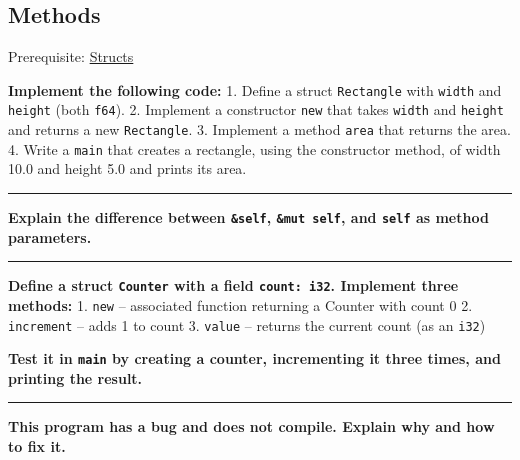 \documentclass[
  11pt,
]{article}
\newenvironment{Shaded}{}{}
\begin{document}
\subsection{Methods}\label{methods}

Prerequisite: \hyperref[structs]{Structs}

\textbf{Implement the following code:} 1. Define a struct
\texttt{Rectangle} with \texttt{width} and \texttt{height} (both
\texttt{f64}). 2. Implement a constructor \texttt{new} that takes
\texttt{width} and \texttt{height} and returns a new \texttt{Rectangle}.
3. Implement a method \texttt{area} that returns the area. 4. Write a
\texttt{main} that creates a rectangle, using the constructor method, of
width 10.0 and height 5.0 and prints its area.

\begin{Shaded}
\begin{Highlighting}[]

\end{Highlighting}
\end{Shaded}

\begin{center}\rule{0.5\linewidth}{0.5pt}\end{center}

\textbf{Explain the difference between \texttt{\&self},
\texttt{\&mut\ self}, and \texttt{self} as method parameters.}

\begin{center}\rule{0.5\linewidth}{0.5pt}\end{center}

\textbf{Define a struct \texttt{Counter} with a field
\texttt{count:\ i32}. Implement three methods:} 1. \texttt{new} --
associated function returning a Counter with count 0 2.
\texttt{increment} -- adds 1 to count 3. \texttt{value} -- returns the
current count (as an \texttt{i32})

\textbf{Test it in \texttt{main} by creating a counter, incrementing it
three times, and printing the result.}

\begin{Shaded}
\begin{Highlighting}[]

\end{Highlighting}
\end{Shaded}

\begin{center}\rule{0.5\linewidth}{0.5pt}\end{center}

\textbf{This program has a bug and does not compile. Explain why and how
to fix it.}
\end{document}
